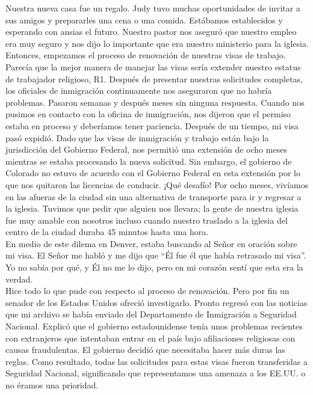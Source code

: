 \documentclass[twoside, 12pt]{book}
\begin{document}
Nuestra nueva casa fue un regalo. Judy tuvo muchas oportunidades de invitar a sus amigos y prepararles una cena o una comida. Estábamos establecidos y esperando con ansias el futuro. Nuestro pastor nos aseguró que nuestro empleo era muy seguro y nos dijo lo importante que era nuestro ministerio para la iglesia. Entonces, empezamos el proceso de renovación de nuestras visas de trabajo. Parecía que la mejor manera de manejar las visas sería extender nuestro estatus de trabajador religioso, R1. Después de presentar nuestras solicitudes completas, los oficiales de inmigración continuamente nos aseguraron que no habría problemas. Pasaron semanas y después meses sin ninguna respuesta. Cuando nos pusimos en contacto con la oficina de inmigración, nos dijeron que el permiso estaba en proceso y deberíamos tener paciencia.
Después de un tiempo, mi visa pasó expidió. Dado que las visas de inmigración y trabajo están bajo la jurisdicción del Gobierno Federal, nos permitió una extensión de ocho meses mientras se estaba procesando la nueva solicitud. Sin embargo, el gobierno de Colorado no estuvo de acuerdo con el Gobierno Federal en esta extensión por lo que nos quitaron las licencias de conducir. ¡Qué desafío! Por ocho meses, vivíamos en las afueras de la ciudad sin una alternativa de transporte para ir y regresar a la iglesia. Tuvimos que pedir que alguien nos llevara; la gente de nuestra iglesia fue muy amable con nosotros incluso cuando nuestro traslado a la iglesia del centro de la ciudad duraba 45 minutos hasta una hora.\\

En medio de este dilema en Denver, estaba buscando al Señor en oración sobre mi visa. El Señor me habló y me dijo que “Él fue él que había retrasado mi visa”. Yo no sabía por qué, y Él no me lo dijo, pero en mi corazón sentí que esta era la verdad.\\

Hice todo lo que pude con respecto al proceso de renovación. Pero por fin un senador de los Estados Unidos ofreció investigarlo. Pronto regresó con las noticias que mi archivo se había enviado del Departamento de Inmigración a Seguridad Nacional. Explicó que el gobierno estadounidense tenía unos problemas recientes con extranjeros que intentaban entrar en el país bajo afiliaciones religiosas con causas fraudulentas. El gobierno decidió que necesitaba hacer más duras las reglas. Como resultado, todas las solicitudes para estas visas fueron transferidas a Seguridad Nacional, significando que representamos una amenaza a los EE.UU. o no éramos una prioridad.\\
\end{document}
